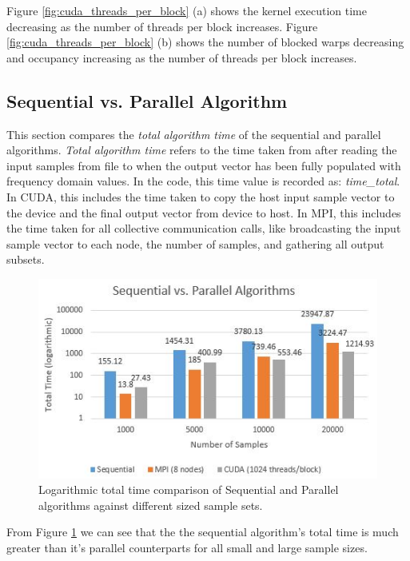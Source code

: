 \documentclass[11pt,a4paper]{article}
\begin{document}
Figure \ref{fig:cuda_threads_per_block} (a) shows the kernel execution time decreasing as the number of threads per block increases. Figure \ref{fig:cuda_threads_per_block} (b) shows the number of blocked warps decreasing and occupancy increasing as the number of threads per block increases.


\subsection{Sequential vs. Parallel Algorithm}
This section compares the \textit{total algorithm time} of the sequential and parallel algorithms. \textit{Total algorithm time} refers to the time taken from after reading the input samples from file to when the output vector has been fully populated with frequency domain values. In the code, this time value is recorded as: \textit{time\_total}. In CUDA, this includes the time taken to copy the host input sample vector to the device and the final output vector from device to host. In MPI, this includes the time taken for all collective communication calls, like broadcasting the input sample vector to each node, the number of samples, and gathering all output subsets.

\begin{figure}
\begin{center}
\includegraphics[scale=0.7]{seq_vs_par}
\end{center}
\caption{Logarithmic total time comparison of Sequential and Parallel algorithms against different sized sample sets.}
\label{fig:seq_vs_par}
\end{figure}

From Figure \ref{fig:seq_vs_par} we can see that the the sequential algorithm's total time is much greater than it's parallel counterparts for all small and large sample sizes.
\end{document}

